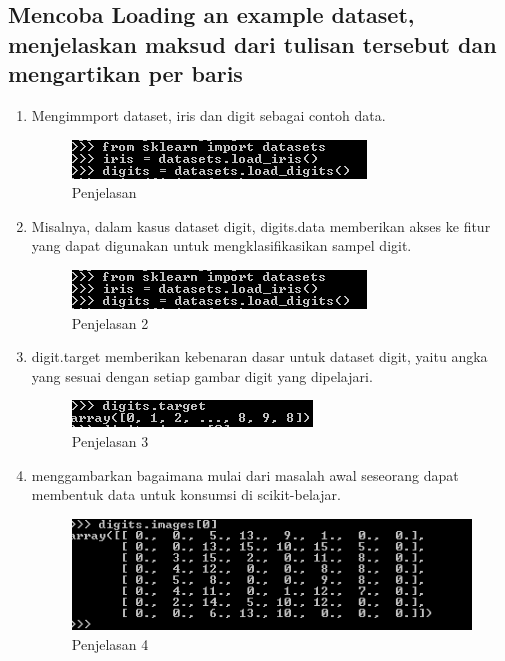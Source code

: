 \subsection{Mencoba Loading an example dataset, menjelaskan maksud dari tulisan tersebut dan mengartikan per baris}
\begin{enumerate}
\item
Mengimmport dataset, iris dan digit sebagai contoh data.
\begin{figure}
	\begin{center}
   	 \includegraphics[scale=1]{figures/penjelasan1.png}
   	 \caption{Penjelasan }	
	\end{center}
\end{figure}
\item
Misalnya, dalam kasus dataset digit, digits.data memberikan akses ke fitur yang dapat digunakan untuk mengklasifikasikan sampel digit.
\begin{figure}
	\begin{center}
   	 \includegraphics[scale=1]{figures/penjelasan1.png}
   	 \caption{Penjelasan 2}	
	\end{center}
\end{figure}
\item 
digit.target memberikan kebenaran dasar untuk dataset digit, yaitu angka yang sesuai dengan setiap gambar digit yang dipelajari.
\begin{figure}
	\begin{center}
   	 \includegraphics[scale=1]{figures/penjelasan3.png}
   	 \caption{Penjelasan 3}	
	\end{center}
\end{figure}
\item 
menggambarkan bagaimana mulai dari masalah awal seseorang dapat membentuk data untuk konsumsi di scikit-belajar.
\begin{figure}
	\begin{center}
   	 \includegraphics[scale=1]{figures/penjelasan4.png}
   	 \caption{Penjelasan 4}	
	\end{center}
\end{figure}

\end{enumerate}

